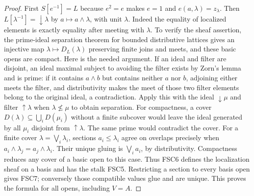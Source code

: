 \documentclass[11pt,a4paper]{article}
\theoremstyle{definition}\newtheorem{definition}[theorem]{Definition}
\begin{document}
\begin{proof}
First $S[e^{-1}]=L$ because $e^2=e$ makes $e=1$ and
$e(a,\lambda)=z_\lambda$. Then
$L[\lambda^{-1}]=\downarrow\lambda$ by $a\mapsto a\wedge\lambda$,
with unit $\lambda$. Indeed the equality of localized elements is
exactly equality after meeting with $\lambda$.
To verify the sheaf assertion, the prime-ideal separation theorem for
bounded distributive lattices gives an injective map
$\lambda\mapsto D_L(\lambda)$ preserving finite joins and meets, and
these basic opens are compact. Here is the needed argument.
If an ideal and filter are disjoint, an ideal maximal subject to
avoiding the filter exists by Zorn's lemma and is prime: if it contains
$a\wedge b$ but contains neither $a$ nor $b$, adjoining either meets
the filter, and distributivity makes the meet of those two filter
elements belong to the original ideal, a contradiction.
Apply this with the ideal $\downarrow\mu$ and filter
$\uparrow\lambda$ when $\lambda\nleq\mu$ to obtain separation.
For compactness, a cover $D(\lambda)\subseteq\bigcup_iD(\mu_i)$
without a finite subcover would leave the ideal generated by all
$\mu_i$ disjoint from $\uparrow\lambda$. The same prime would
contradict the cover.
For a finite cover $\lambda=\bigvee_i\lambda_i$, sections
$a_i\le\lambda_i$ agree on overlaps precisely when
$a_i\wedge\lambda_j=a_j\wedge\lambda_i$. Their unique gluing is
$\bigvee_i a_i$, by distributivity. Compactness reduces any cover of a
basic open to this case. Thus FSC6 defines the localization sheaf on
a basis and has the stalk FSC5. Restricting a section to every basis
open gives FSC7; conversely those compatible values glue and are
unique. This proves the formula for all opens, including $V=A$.
\end{proof}
\end{document}
